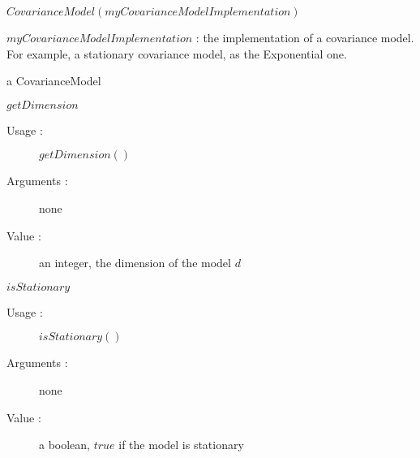 \begin{description}

\item[Usage :] $CovarianceModel(myCovarianceModelImplementation)$
  \bigskip

\item[Arguments :] $myCovarianceModelImplementation$ : the implementation of a covariance model. For example, a stationary covariance model, as the Exponential one.

  \bigskip

\item[Value :] a CovarianceModel
  \bigskip

\item[Some methods :]  \rule{0pt}{1em}

  \begin{description}

    \item $getDimension$
    \begin{description}
    \item[Usage :] $getDimension()$
    \item[Arguments :] none
    \item[Value :]   an integer, the dimension of the model $d$
    \end{description}
    \bigskip

  \item $isStationary$
    \begin{description}
    \item[Usage :] $isStationary()$
    \item[Arguments :] none
    \item[Value :] a boolean, $true$ if the model is stationary
    \end{description}
    \bigskip


\end{description}
\end{description}
